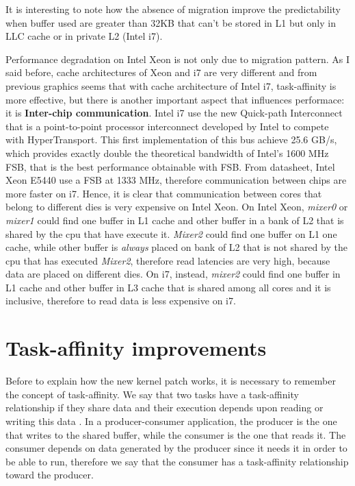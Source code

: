 It is interesting to note how the absence of migration improve the predictability when buffer used are greater than 32KB that can't be stored in L1 but 
only in LLC cache or in private L2 (Intel i7).

Performance degradation on Intel Xeon is not only due to migration pattern. As I said before, cache architectures of Xeon and i7 are very different and
from previous graphics seems that with cache architecture of Intel i7, task-affinity is more effective, but there is another important aspect that 
influences performace: it is \textbf{Inter-chip communication}. Intel i7 use the new Quick-path Interconnect that is a point-to-point processor 
interconnect developed by Intel to compete with HyperTransport. This first implementation of this bus achieve 25.6 GB/s, which provides exactly double the 
theoretical bandwidth of Intel's 1600 MHz FSB, that is the best performance obtainable with FSB. From datasheet, Intel Xeon E5440 use a FSB at 1333 MHz, 
therefore communication between chips are more faster on i7. Hence, it is clear that communication between cores that belong to different dies is very 
expensive on Intel Xeon. On Intel Xeon, \textit{mixer0} or \textit{mixer1} could find one buffer in L1 cache and other buffer in a bank of L2 that is 
shared by the cpu that have execute it. \textit{Mixer2} could find one buffer on L1 one cache, while other buffer is \textit{always} placed on bank of L2 
that is not shared by the cpu that has executed \textit{Mixer2}, therefore read latencies are very high, because data are placed on different dies. 
On i7, instead, \textit{mixer2} could find one buffer in L1 cache and other buffer in L3 cache that is shared among all cores and it is inclusive, 
therefore to read data is less expensive on i7.

\section{Task-affinity improvements}

Before to explain how the new kernel patch works, it is necessary to remember the concept of task-affinity. We say that two tasks have a task-affinity 
relationship if they share data and their execution depends upon reading or writing this data \cite{lcs}. In a producer-consumer application, the 
producer is the one that writes to the shared buffer, while the consumer is the one that reads it. The consumer depends on data generated by the producer 
since it needs it in order to be able to run, therefore we say that the consumer has a task-affinity relationship toward the producer.

